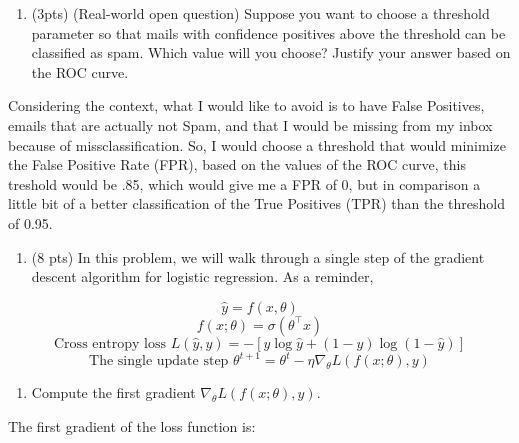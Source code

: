 \documentclass[11pt]{article}
\providecommand{\tightlist}{%
      \setlength{\itemsep}{0pt}\setlength{\parskip}{0pt}}
\begin{document}
    \begin{enumerate}
\def\labelenumi{(\alph{enumi})}
\setcounter{enumi}{1}
\tightlist
\item
  (3pts) (Real-world open question) Suppose you want to choose a
  threshold parameter so that mails with confidence positives above the
  threshold can be classified as spam. Which value will you choose?
  Justify your answer based on the ROC curve.
\end{enumerate}

    Considering the context, what I would like to avoid is to have False
Positives, emails that are actually not Spam, and that I would be
missing from my inbox because of missclassification. So, I would choose
a threshold that would minimize the False Positive Rate (FPR), based on
the values of the ROC curve, this treshold would be .85, which would
give me a FPR of 0, but in comparison a little bit of a better
classification of the True Positives (TPR) than the threshold of 0.95.

    \begin{enumerate}
\def\labelenumi{\arabic{enumi}.}
\setcounter{enumi}{5}
\tightlist
\item
  (8 pts) In this problem, we will walk through a single step of the
  gradient descent algorithm for logistic regression. As a reminder,
\end{enumerate}

\[\hat{y} = f(x, \theta)\] \[f(x;\theta) = \sigma(\theta^\top x)\]
\[\text{Cross entropy loss } L(\hat{y}, y) = -[y \log  \hat{y} + (1-y)\log(1-\hat{y})]\]
\[\text{The single update step } \theta^{t+1} = \theta^{t} - \eta \nabla_{\theta} L(f(x;\theta), y) \]

    \begin{enumerate}
\def\labelenumi{(\alph{enumi})}
\tightlist
\item
  Compute the first gradient \(\nabla_{\theta} L(f(x;\theta), y)\).
\end{enumerate}

    The first gradient of the loss function is:
\end{document}
